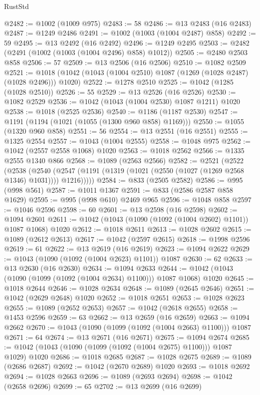 \begin{lexlean}{RustStd}
\begin{coremodule}
@2482 := @1002 (@1009 @975)
@2483 := 58
@2486 := @13 @2483 (@16 @2483)
@2487 := @1249 @2486
@2491 := @1002 (@1003 (@1004 @2487) @858)
@2492 := 59
@2495 := @13 @2492 (@16 @2492)
@2496 := @1249 @2495
@2503 := @2482 (@2491 (@1002 (@1003 (@1004 @2496) @858) @1012))
@2505 := @2480 @2503 @858
@2506 := 57
@2509 := @13 @2506 (@16 @2506)
@2510 := @1082 @2509
@2521 := @1018 (@1042 (@1043 (@1004 @2510) @1087 (@1269 (@1028 @2487) (@1028 @2496))) @1020)
@2522 := @1278 @2510
@2525 := @1042 (@1285 (@1028 @2510))
@2526 := 55
@2529 := @13 @2526 (@16 @2526)
@2530 := @1082 @2529
@2536 := @1042 (@1043 (@1004 @2530) @1087 @1211) @1020
@2538 := @1018 (@2525 @2536)
@2540 := @1186 (@1187 @2530)
@2547 := @1191 (@1194 (@1021 (@1055 (@1300 @960 @858) @1169)))
@2550 := @1055 (@1320 @960 @858)
@2551 := 56
@2554 := @13 @2551 (@16 @2551)
@2555 := @1325 @2554
@2557 := @1043 (@1004 @2555)
@2558 := @1048 @975
@2562 := @1042 (@2557 @2558 @1068) @1020
@2563 := @1018 @2562
@2566 := @1335 @2555 @1340 @866
@2568 := @1089 (@2563 @2566)
@2582 := @2521
    (@2522
      (@2538
        (@2540 (@2547 (@1191 (@1319 (@1021 (@2550 (@1027 (@1269 @2568 @1346) @1031)))) @1216)))))
@2584 := @833 (@2505 @2582)
@2586 := @995 (@998 @561)
@2587 := @1011 @1367
@2591 := @833 (@2586 @2587 @858 @1629)
@2595 := @995 (@998 @610) @2469 @965
@2596 := @1048 @858
@2597 := @1046 @2596
@2598 := 60
@2601 := @13 @2598 (@16 @2598)
@2602 := @1094 @2601
@2611 := @1042 (@1043 (@1090 (@1092 (@1004 @2602) @1101)) @1087 @1068) @1020
@2612 := @1018 @2611
@2613 := @1028 @2602
@2615 := @1089 (@2612 @2613)
@2617 := @1042 (@2597 @2615)
@2618 := @1998 @2596
@2619 := 61
@2622 := @13 @2619 (@16 @2619)
@2623 := @1094 @2622
@2629 := @1043 (@1090 (@1092 (@1004 @2623) @1101)) @1087
@2630 := 62
@2633 := @13 @2630 (@16 @2630)
@2634 := @1094 @2633
@2644 := @1042 (@1043 (@1090 (@1099 (@1092 (@1004 @2634) @1100))) @1087 @1068) @1020
@2645 := @1018 @2644
@2646 := @1028 @2634
@2648 := @1089 (@2645 @2646)
@2651 := @1042 (@2629 @2648) @1020
@2652 := @1018 @2651
@2653 := @1028 @2623
@2655 := @1089 (@2652 @2653)
@2657 := @1042 (@2618 @2655)
@2658 := @1453 @2596
@2659 := 63
@2662 := @13 @2659 (@16 @2659)
@2663 := @1094 @2662
@2670 := @1043 (@1090 (@1099 (@1092 (@1004 @2663) @1100))) @1087
@2671 := 64
@2674 := @13 @2671 (@16 @2671)
@2675 := @1094 @2674
@2685 := @1042 (@1043 (@1090 (@1099 (@1092 (@1004 @2675) @1100))) @1087 @1029) @1020
@2686 := @1018 @2685
@2687 := @1028 @2675
@2689 := @1089 (@2686 @2687)
@2692 := @1042 (@2670 @2689) @1020
@2693 := @1018 @2692
@2694 := @1028 @2663
@2696 := @1089 (@2693 @2694)
@2698 := @1042 (@2658 @2696)
@2699 := 65
@2702 := @13 @2699 (@16 @2699)

\end{coremodule}
\end{lexlean}
